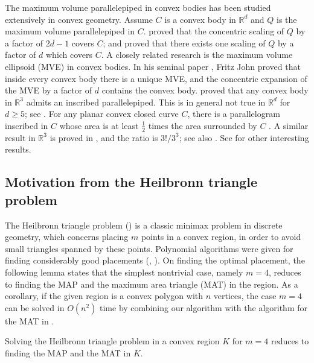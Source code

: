 \documentclass{ws-ijcga}
\begin{document}
The maximum volume parallelepiped in convex bodies has been studied extensively in convex geometry.
Assume $C$ is a convex body in $\mathbb{R}^d$ and $Q$ is the maximum volume parallelepiped in $C$.
\cite{Math-approx-GD98} proved that the concentric scaling of $Q$ by a factor of $2d-1$ covers $C$; and
\cite{Math-approx-JDG04} proved that there exists one scaling of $Q$ by a factor of $d$ which covers $C$.
A closely related research is the maximum volume ellipsoid (MVE) in convex bodies.
In his seminal paper \cite{ellipse-john-CAV48}, Fritz John proved that inside every convex body there is a unique MVE, and the concentric expansion of the MVE by a factor of $d$ contains the convex body.
\cite{Math-3dinscribed-french54} proved that any convex body in $\mathbb{R}^3$ admits an inscribed parallelepiped.
This is in general not true in $\mathbb{R}^d$ for $d\geq 5$; see \cite{Math-survey-GM97}.
For any planar convex closed curve $C$, there is a parallelogram inscribed in $C$ whose area is at least $\frac{1}{2}$ times the area surrounded by $C$ \cite{Math-PinC-AMM60}.
A similar result in $\mathbb{R}^3$ is proved in \cite{Math-3dinscribed-french52}, and the ratio is $3!/3^3$; see also \cite{Math-PinS-DM00,Math-PinS-DCG99}.
See \cite{Math-PinE-AMM07,Math-SafeDomain-EJP04} for other interesting results.

\subsection{Motivation from the Heilbronn triangle problem}\label{subsect:heil}

The Heilbronn triangle problem (\cite{Heilbronn-convexhull-LMS71}) is a classic minimax problem in discrete geometry,
    which concerns placing $m$ points in a convex region, in order to avoid small triangles spanned by these points.
Polynomial algorithms were given for finding considerably good placements (\cite{Heilbronn-Lefmann-JC00}, \cite{Heilbronn-Lefmann3d-JC02}).
On finding the optimal placement, the following lemma states that the simplest nontrivial case, namely $m=4$, reduces to finding the MAP and the maximum area triangle (MAT) in the region.
As a corollary, if the given region is a convex polygon with $n$ vertices, the case $m=4$ can be solved in $O(n^2)$ time by combining our algorithm with the algorithm for the MAT in \cite{Triangle-ultimate-Arxiv}.

\begin{lemma}[Reduction]
  Solving the Heilbronn triangle problem in a convex region $K$ for $m=4$ reduces to finding the MAP and the MAT in $K$.
\end{lemma}
\end{document}
